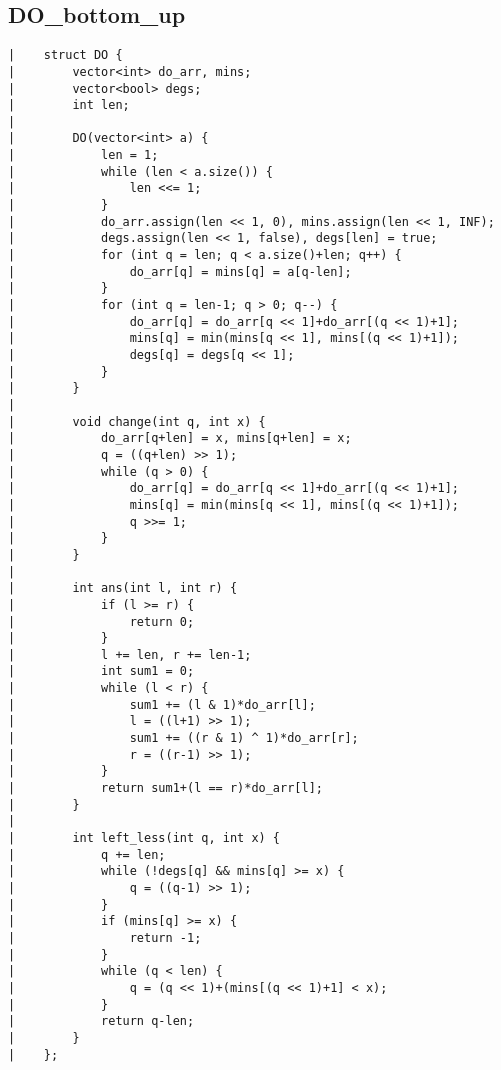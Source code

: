 \documentclass[a4paper, 10pt]{article}
\begin{document}
\begin{center}
\section*{DO\_bottom\_up}
\begin{verbatim}
|    struct DO {
|        vector<int> do_arr, mins;
|        vector<bool> degs;
|        int len;
|     
|        DO(vector<int> a) {
|            len = 1;
|            while (len < a.size()) {
|                len <<= 1;
|            }
|            do_arr.assign(len << 1, 0), mins.assign(len << 1, INF);
|            degs.assign(len << 1, false), degs[len] = true;
|            for (int q = len; q < a.size()+len; q++) {
|                do_arr[q] = mins[q] = a[q-len];
|            }
|            for (int q = len-1; q > 0; q--) {
|                do_arr[q] = do_arr[q << 1]+do_arr[(q << 1)+1];
|                mins[q] = min(mins[q << 1], mins[(q << 1)+1]);
|                degs[q] = degs[q << 1];
|            }
|        }
|     
|        void change(int q, int x) {
|            do_arr[q+len] = x, mins[q+len] = x;
|            q = ((q+len) >> 1);
|            while (q > 0) {
|                do_arr[q] = do_arr[q << 1]+do_arr[(q << 1)+1];
|                mins[q] = min(mins[q << 1], mins[(q << 1)+1]);
|                q >>= 1;
|            }
|        }
|     
|        int ans(int l, int r) {
|            if (l >= r) {
|                return 0;
|            }
|            l += len, r += len-1;
|            int sum1 = 0;
|            while (l < r) {
|                sum1 += (l & 1)*do_arr[l];
|                l = ((l+1) >> 1);
|                sum1 += ((r & 1) ^ 1)*do_arr[r];
|                r = ((r-1) >> 1);
|            }
|            return sum1+(l == r)*do_arr[l];
|        }
|     
|        int left_less(int q, int x) {
|            q += len;
|            while (!degs[q] && mins[q] >= x) {
|                q = ((q-1) >> 1);
|            }
|            if (mins[q] >= x) {
|                return -1;
|            }
|            while (q < len) {
|                q = (q << 1)+(mins[(q << 1)+1] < x);
|            }
|            return q-len;
|        }
|    };
\end{verbatim}


\end{center}
\end{document}
